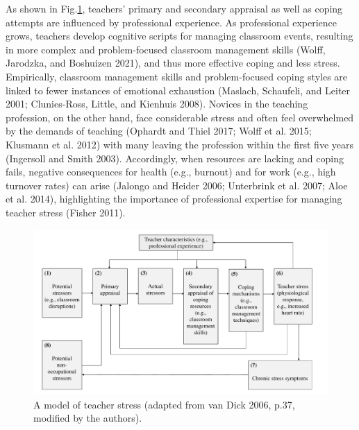 \documentclass[preprint,
3p]{elsarticle} %
\begin{document}
As shown in Fig.\ref{fig.1}, teachers' primary and secondary appraisal
as well as coping attempts are influenced by professional experience. As
professional experience grows, teachers develop cognitive scripts for
managing classroom events, resulting in more complex and problem-focused
classroom management skills (Wolff, Jarodzka, and Boshuizen 2021), and
thus more effective coping and less stress. Empirically, classroom
management skills and problem-focused coping styles are linked to fewer
instances of emotional exhaustion (Maslach, Schaufeli, and Leiter 2001;
Clunies-Ross, Little, and Kienhuis 2008). Novices in the teaching
profession, on the other hand, face considerable stress and often feel
overwhelmed by the demands of teaching (Ophardt and Thiel 2017; Wolff et
al. 2015; Klusmann et al. 2012) with many leaving the profession within
the first five years (Ingersoll and Smith 2003). Accordingly, when
resources are lacking and coping fails, negative consequences for health
(e.g., burnout) and for work (e.g., high turnover rates) can arise
(Jalongo and Heider 2006; Unterbrink et al. 2007; Aloe et al. 2014),
highlighting the importance of professional expertise for managing
teacher stress (Fisher 2011).

\captionsetup[figure]{
    labelsep=colon,      %
    font=footnotesize,           %
    justification=justified, %
    singlelinecheck=false %
}

\captionsetup[table]{
    labelsep=colon,      %
    font=footnotesize,           %
    justification=justified, %
    singlelinecheck=false %
}

\begin{figure}[htbp]
  \centering
  \includegraphics[width=1\textwidth]{images/Model_Teacher_Stress_adapted_new.pdf}
  \caption{A model of teacher stress (adapted from van Dick 2006, p.37, modified by the authors).}
  \label{fig.1}
\end{figure}
\end{document}
